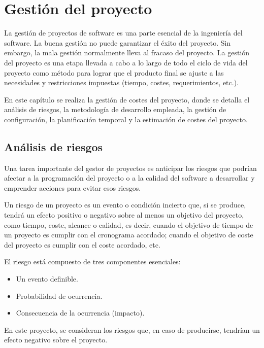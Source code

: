 \chapter{Gestión del proyecto}
La gestión de proyectos de software es una parte esencial de la ingeniería del software. La buena gestión no puede garantizar el éxito del proyecto. Sin embargo, la mala gestión normalmente lleva al fracaso del proyecto. La gestión del proyecto es una etapa llevada a cabo a lo largo de todo el ciclo de vida del proyecto como método para lograr que el producto final se ajuste a las necesidades y restricciones impuestas (tiempo, costes, requerimientos, etc.).

En este capítulo se realiza la gestión de costes del proyecto, donde se detalla el análisis de riesgos, la metodología de desarrollo empleada,  la gestión de configuración, la planificación temporal y la estimación de costes del proyecto.

\section{Análisis de riesgos} \label{riesgos}
Una tarea importante del gestor de proyectos es anticipar los riesgos que podrían afectar a la programación del proyecto o a la calidad del software a desarrollar y emprender acciones para evitar esos riesgos.

Un riesgo de un proyecto es un evento o condición incierto que, si se produce, tendrá un efecto positivo o negativo sobre al menos un objetivo del proyecto, como tiempo, coste, alcance o calidad, es decir, cuando el objetivo de tiempo de un proyecto es cumplir con el cronograma acordado; cuando el objetivo de coste del proyecto es cumplir con el coste acordado, etc. 

El riesgo está compuesto de tres componentes esenciales:
\begin{itemize}
\item Un evento definible.
\item Probabilidad de ocurrencia.
\item Consecuencia de la ocurrencia (impacto).
\end{itemize}

En este proyecto, se consideran los riesgos que, en caso de producirse, tendrían un efecto negativo sobre el proyecto.

